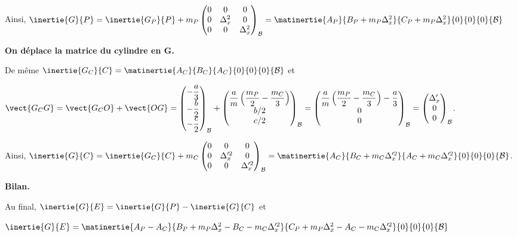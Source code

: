 \begin{corrigebox}
Ainsi, 
$\inertie{G}{P} = \inertie{G_P}{P} + m_P\begin{pmatrix}
0 & 0 & 0\\
0 & \Delta_x^2 & 0 \\
0 & 0 & \Delta_x^2
\end{pmatrix}_{\mathcal{B}}
= \matinertie{A_P}{B_P+m_P\Delta_x^2}{C_P+m_P\Delta_x^2}{0}{0}{0}{\mathcal{B}}
$

\textbf{On déplace la matrice du cylindre en G.}

De même $\inertie{G_C}{C}=\matinertie{A_C}{B_C}{A_C}{0}{0}{0}{\mathcal{B}}$ et

$\vect{G_C G} = \vect{G_C O} + \vect{O G} = 
\begin{pmatrix}
-\dfrac{a}{3} \\
-\dfrac{b}{2} \\
-\dfrac{c}{2}
\end{pmatrix}_{\mathcal{B}} 
+
\begin{pmatrix}
\dfrac{a}{m} \left( \dfrac{m_P}{2} -  \dfrac{m_C}{3}\right) \\
b/2 \\
c/2
\end{pmatrix}_{\mathcal{B}}=
\begin{pmatrix}
\dfrac{a}{m} \left( \dfrac{m_P}{2} -  \dfrac{m_C}{3}\right) -\dfrac{a}{3}\\
0 \\
0
\end{pmatrix}_{\mathcal{B}}=
\begin{pmatrix}
\Delta_x'\\
0 \\
0
\end{pmatrix}_{\mathcal{B}}$.

Ainsi, 
$\inertie{G}{C} = \inertie{G_C}{C} + m_C\begin{pmatrix}
0 & 0 & 0\\
0 & \Delta_x'^2 & 0 \\
0 & 0 & \Delta_x'^2
\end{pmatrix}_{\mathcal{B}}
= \matinertie{A_C}{B_C+m_C\Delta_x'^2}{A_C+m_C\Delta_x'^2}{0}{0}{0}{\mathcal{B}}
$.

\textbf{Bilan.}

Au final, $\inertie{G}{E} = \inertie{G}{P} - \inertie{G}{C}$ et 

$\inertie{G}{E} = \matinertie{A_P-A_C}{B_P+m_P\Delta_x^2-B_C-m_C\Delta_x'^2}{C_P+m_P\Delta_x^2-A_C-m_C\Delta_x'^2}{0}{0}{0}{\mathcal{B}} $
\end{corrigebox}
